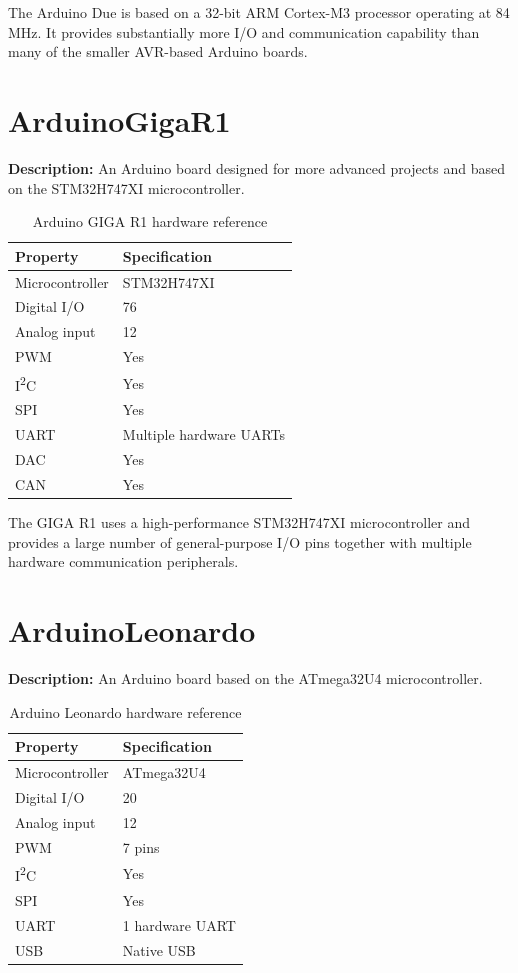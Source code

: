The Arduino Due is based on a 32-bit ARM Cortex-M3 processor operating at
84 MHz. It provides substantially more I/O and communication capability
than many of the smaller AVR-based Arduino boards.

\newpage
\section{ArduinoGigaR1}

\textbf{Description:} An Arduino board designed for more advanced projects
and based on the STM32H747XI microcontroller.

\begin{table}[H]
\centering
\caption{Arduino GIGA R1 hardware reference}
\label{tab:board-giga-r1}
\begin{tabular}{ll}
\toprule
\textbf{Property} & \textbf{Specification} \\
\midrule
Microcontroller & STM32H747XI \\
Digital I/O & 76 \\
Analog input & 12 \\
PWM & Yes \\
I\textsuperscript{2}C & Yes \\
SPI & Yes \\
UART & Multiple hardware UARTs \\
DAC & Yes \\
CAN & Yes \\
\bottomrule
\end{tabular}
\end{table}

The GIGA R1 uses a high-performance STM32H747XI microcontroller and provides
a large number of general-purpose I/O pins together with multiple hardware
communication peripherals.

\section{ArduinoLeonardo}

\textbf{Description:} An Arduino board based on the ATmega32U4
microcontroller.

\begin{table}[H]
\centering
\caption{Arduino Leonardo hardware reference}
\label{tab:board-leonardo}
\begin{tabular}{ll}
\toprule
\textbf{Property} & \textbf{Specification} \\
\midrule
Microcontroller & ATmega32U4 \\
Digital I/O & 20 \\
Analog input & 12 \\
PWM & 7 pins \\
I\textsuperscript{2}C & Yes \\
SPI & Yes \\
UART & 1 hardware UART \\
USB & Native USB \\
\bottomrule
\end{tabular}
\end{table}

